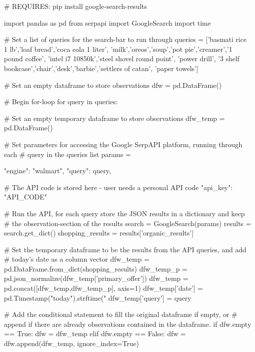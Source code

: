 \begin{python}
# REQUIRES: pip install google-search-results

import pandas as pd
from serpapi import GoogleSearch
import time

# Set a list of queries for the search-bar to run through
queries = ['basmati rice 1 lb','loaf bread','coca cola 1 liter',
           'milk','oreos','soup','pot pie','creamer','1 pound coffee',
           'intel i7 10850k','steel shovel round point', 'power drill',
           '3 shelf bookcase','chair','desk','barbie','settlers of catan',
           'paper towels']

# Set an empty dataframe to store observations
dfw = pd.DataFrame()

# Begin for-loop
for query in queries:
    
    # Set an empty temporary dataframe to store observations
    dfw_temp = pd.DataFrame()
    
    # Set parameters for accessing the Google SerpAPI platform, running through each 
    # query in the queries list
    params = {
        "engine": "walmart",
        "query": query,
        
        # The API code is stored here - user needs a personal API code
        "api_key": "API_CODE" 
    }

    # Run the API, for each query store the JSON results in a dictionary and keep 
    # the observation-section of the results
    search = GoogleSearch(params)
    results = search.get_dict()
    shopping_results = results['organic_results']
    
    # Set the temporary dataframe to be the results from the API queries, and add 
    # today's date as a column vector
    dfw_temp = pd.DataFrame.from_dict(shopping_results)
    dfw_temp_p = pd.json_normalize(dfw_temp['primary_offer'])
    dfw_temp = pd.concat([dfw_temp,dfw_temp_p], axis=1)
    dfw_temp['date'] = pd.Timestamp("today").strftime("%
    dfw_temp['query'] = query

    # Add the conditional statement to fill the original dataframe if empty, or 
    # append if there are already observations contained in the dataframe.
    if dfw.empty == True:
        dfw = dfw_temp
    elif dfw.empty == False:
        dfw = dfw.append(dfw_temp, ignore_index=True)
        

\end{python}
